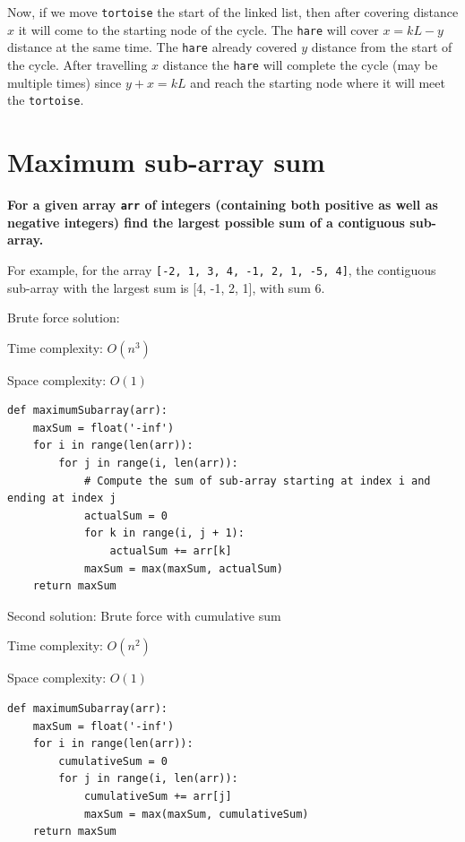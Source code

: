 \documentclass[a4paper,11pt]{book}
\begin{document}
\noindent Now, if we move \lstinline{tortoise} the start of the linked list, then after covering distance $x$ it will come to the starting node of the cycle. The \lstinline{hare} will cover $x = k L-y$ distance at the same time. The \lstinline{hare} already covered $y$ distance from the start of the cycle. After travelling $x$ distance the \lstinline{hare} will complete the cycle (may be multiple times) since $y+x=k L$ and reach the starting node where it will meet the \lstinline{tortoise}.

\newpage
\section{Maximum sub-array sum}

\noindent \textbf{For a given array \lstinline{arr} of integers (containing both positive as well as negative integers) find the largest possible sum of a contiguous sub-array.}
\vspace{5mm}

\noindent For example, for the array \lstinline{[-2, 1, 3, 4, -1, 2, 1, -5, 4]}, the contiguous sub-array with the largest sum is [4, -1, 2, 1], with sum 6.
\vspace{5mm}

\noindent Brute force solution:

\noindent Time complexity: $O(n^3)$

\noindent Space complexity: $O(1)$

\begin{lstlisting}
def maximumSubarray(arr):
    maxSum = float('-inf')
    for i in range(len(arr)):
        for j in range(i, len(arr)):
            # Compute the sum of sub-array starting at index i and ending at index j
            actualSum = 0
            for k in range(i, j + 1):
                actualSum += arr[k]
            maxSum = max(maxSum, actualSum)
    return maxSum
\end{lstlisting}

\noindent Second solution: Brute force with cumulative sum

\noindent Time complexity: $O(n^2)$

\noindent Space complexity: $O(1)$

\begin{lstlisting}
def maximumSubarray(arr):
    maxSum = float('-inf')
    for i in range(len(arr)):
        cumulativeSum = 0
        for j in range(i, len(arr)):
            cumulativeSum += arr[j]
            maxSum = max(maxSum, cumulativeSum)
    return maxSum
\end{lstlisting}
\end{document}
